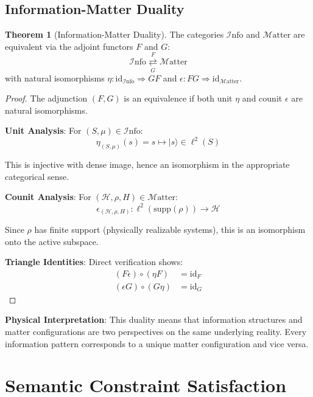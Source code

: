 \documentclass[11pt]{article}
\theoremstyle{definition}
\newtheorem{theorem}{Theorem}[section]
\newcommand{\Info}{\mathcal{I}\text{nfo}}
\newcommand{\Matter}{\mathcal{M}\text{atter}}
\newcommand{\Hil}{\mathcal{H}}
\newcommand{\supp}{\text{supp}}
\newcommand{\id}{\text{id}}
\begin{document}
\subsection{Information-Matter Duality}

\begin{theorem}[Information-Matter Duality]
The categories $\Info$ and $\Matter$ are equivalent via the adjoint functors $F$ and $G$:
\begin{equation}
\Info \underset{G}{\overset{F}{\rightleftarrows}} \Matter
\end{equation}
with natural isomorphisms $\eta: \id_{\Info} \Rightarrow GF$ and $\epsilon: FG \Rightarrow \id_{\Matter}$.
\end{theorem}

\begin{proof}
The adjunction $(F, G)$ is an equivalence if both unit $\eta$ and counit $\epsilon$ are natural isomorphisms.

\textbf{Unit Analysis}: For $(S, \mu) \in \Info$:
\begin{equation}
\eta_{(S,\mu)}(s) = s \mapsto |s\rangle \in \ell^2(S)
\end{equation}

This is injective with dense image, hence an isomorphism in the appropriate categorical sense.

\textbf{Counit Analysis}: For $(\Hil, \rho, H) \in \Matter$:
\begin{equation}
\epsilon_{(\Hil,\rho,H)}: \ell^2(\supp(\rho)) \to \Hil
\end{equation}

Since $\rho$ has finite support (physically realizable systems), this is an isomorphism onto the active subspace.

\textbf{Triangle Identities}: Direct verification shows:
\begin{align}
(F\epsilon) \circ (\eta F) &= \id_F \\
(\epsilon G) \circ (G\eta) &= \id_G
\end{align}
\end{proof}

\textbf{Physical Interpretation}: This duality means that information structures and matter configurations are two perspectives on the same underlying reality. Every information pattern corresponds to a unique matter configuration and vice versa.

\section{Semantic Constraint Satisfaction}
\end{document}
